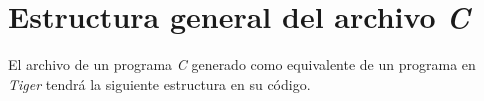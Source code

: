 \documentclass{article}
\begin{document}





\section{Estructura general del archivo \emph{C}}

El archivo de un programa \textit{C} generado como equivalente de un programa en
\textit{Tiger} tendrá la siguiente estructura en su código.
\end{document}
